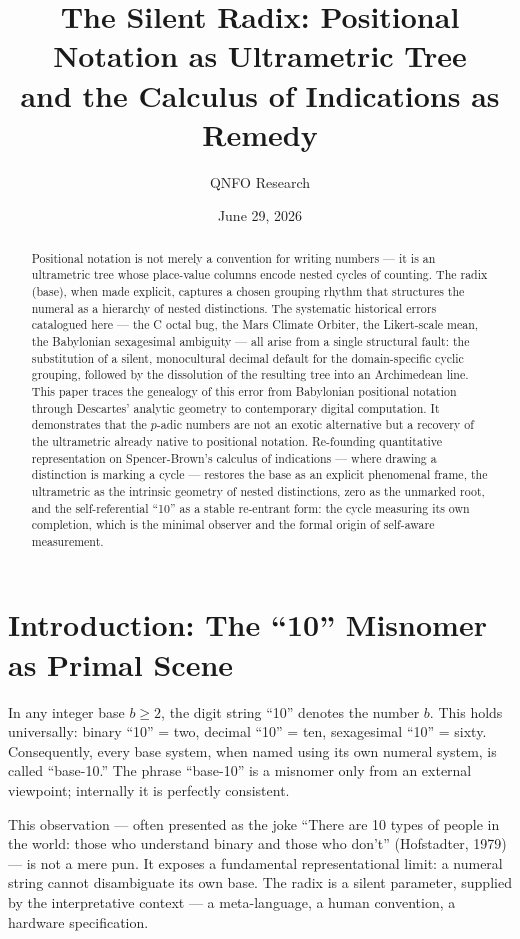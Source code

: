 \documentclass[12pt,a4paper]{article}
\title{The Silent Radix: Positional Notation as Ultrametric Tree\\
       and the Calculus of Indications as Remedy}
\author{QNFO Research}
\date{June 29, 2026}
\theoremstyle{definition}
\theoremstyle{remark}
\begin{document}
\maketitle

\begin{abstract}
Positional notation is not merely a convention for writing numbers --- it is an
ultrametric tree whose place-value columns encode nested cycles of counting. The
radix (base), when made explicit, captures a chosen grouping rhythm that structures
the numeral as a hierarchy of nested distinctions. The systematic historical errors
catalogued here --- the C octal bug, the Mars Climate Orbiter, the Likert-scale
mean, the Babylonian sexagesimal ambiguity --- all arise from a single structural
fault: the substitution of a silent, monocultural decimal default for the
domain-specific cyclic grouping, followed by the dissolution of the resulting tree
into an Archimedean line. This paper traces the genealogy of this error from
Babylonian positional notation through Descartes' analytic geometry to contemporary
digital computation. It demonstrates that the $p$-adic numbers are not an exotic
alternative but a recovery of the ultrametric already native to positional
notation. Re-founding quantitative representation on Spencer-Brown's calculus of
indications --- where drawing a distinction is marking a cycle --- restores the
base as an explicit phenomenal frame, the ultrametric as the intrinsic geometry of
nested distinctions, zero as the unmarked root, and the self-referential ``10'' as
a stable re-entrant form: the cycle measuring its own completion, which is the
minimal observer and the formal origin of self-aware measurement.
\end{abstract}

\section{Introduction: The ``10'' Misnomer as Primal Scene}

In any integer base $b \geq 2$, the digit string ``10'' denotes the number $b$.
This holds universally: binary ``10'' = two, decimal ``10'' = ten, sexagesimal
``10'' = sixty. Consequently, every base system, when named using its own numeral
system, is called ``base-10.'' The phrase ``base-10'' is a misnomer only from an
external viewpoint; internally it is perfectly consistent.

This observation --- often presented as the joke ``There are 10 types of people in
the world: those who understand binary and those who don't'' (Hofstadter, 1979) ---
is not a mere pun. It exposes a fundamental representational limit: a numeral
string cannot disambiguate its own base. The radix is a silent parameter, supplied
by the interpretative context --- a meta-language, a human convention, a hardware
specification.
\end{document}
